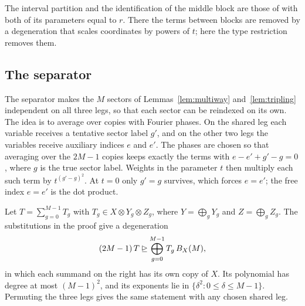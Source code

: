 The interval partition and the identification of the middle block are
those of \citet[Lemma~4.2]{OAI26} with both of its parameters equal to
\(r\). There the terms between blocks are removed by a degeneration that
scales coordinates by powers of \(t\); here the type restriction removes
them.

\subsection{The separator}
\label{subsec:separator}

The separator makes the \(M\) sectors of Lemmas~\ref{lem:multiway}
and~\ref{lem:tripling} independent on all three legs, so that each sector
can be reindexed on its own. The idea is to average over copies with
Fourier phases. On the shared leg each variable receives a tentative
sector label \(g'\), and on the other two legs the variables receive
auxiliary indices \(e\) and \(e'\). The phases are chosen so that
averaging over the \(2M-1\) copies keeps exactly the terms with
\(e-e'+g'-g=0\), where \(g\) is the true sector label. Weights in the
parameter \(t\) then multiply each such term by \(t^{(g'-g)^2}\). At
\(t=0\) only \(g'=g\) survives, which forces \(e=e'\); the free index
\(e=e'\) is the dot product.

\begin{proposition}[Separator]\label{prop:separator}
Let \(T=\sum_{g=0}^{M-1}T_g\) with \(T_g\in X\otimes Y_g\otimes Z_g\),
where \(Y=\bigoplus_gY_g\) and \(Z=\bigoplus_gZ_g\). The substitutions
in the proof give a degeneration
\begin{equation}\label{eq:separator}
 (2M-1)\,T\unrhd\bigoplus_{g=0}^{M-1}T_g\,B_X(M),
\end{equation}
in which each summand on the right has its own copy of \(X\). Its
polynomial has degree at most \((M-1)^2\), and its exponents lie in
\(\{\delta^2:0\le\delta\le M-1\}\). Permuting the three legs gives the
same statement with any chosen shared leg.
\end{proposition}

